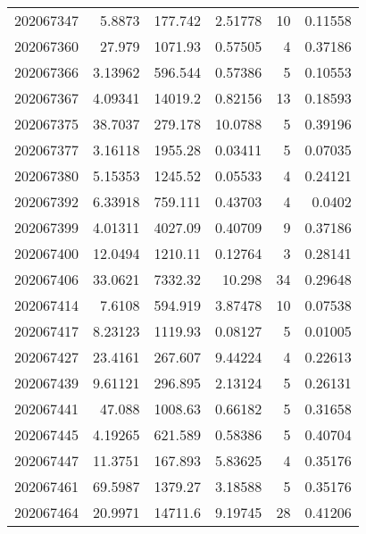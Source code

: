 \begin{tabular}{rrrrrr}
 202067347 &          5.8873  &      177.742  &            2.51778 &          10 & 0.11558 \\
 202067360 &         27.979   &     1071.93   &            0.57505 &           4 & 0.37186 \\
 202067366 &          3.13962 &      596.544  &            0.57386 &           5 & 0.10553 \\
 202067367 &          4.09341 &    14019.2    &            0.82156 &          13 & 0.18593 \\
 202067375 &         38.7037  &      279.178  &           10.0788  &           5 & 0.39196 \\
 202067377 &          3.16118 &     1955.28   &            0.03411 &           5 & 0.07035 \\
 202067380 &          5.15353 &     1245.52   &            0.05533 &           4 & 0.24121 \\
 202067392 &          6.33918 &      759.111  &            0.43703 &           4 & 0.0402  \\
 202067399 &          4.01311 &     4027.09   &            0.40709 &           9 & 0.37186 \\
 202067400 &         12.0494  &     1210.11   &            0.12764 &           3 & 0.28141 \\
 202067406 &         33.0621  &     7332.32   &           10.298   &          34 & 0.29648 \\
 202067414 &          7.6108  &      594.919  &            3.87478 &          10 & 0.07538 \\
 202067417 &          8.23123 &     1119.93   &            0.08127 &           5 & 0.01005 \\
 202067427 &         23.4161  &      267.607  &            9.44224 &           4 & 0.22613 \\
 202067439 &          9.61121 &      296.895  &            2.13124 &           5 & 0.26131 \\
 202067441 &         47.088   &     1008.63   &            0.66182 &           5 & 0.31658 \\
 202067445 &          4.19265 &      621.589  &            0.58386 &           5 & 0.40704 \\
 202067447 &         11.3751  &      167.893  &            5.83625 &           4 & 0.35176 \\
 202067461 &         69.5987  &     1379.27   &            3.18588 &           5 & 0.35176 \\
 202067464 &         20.9971  &    14711.6    &            9.19745 &          28 & 0.41206 \\

\end{tabular}
